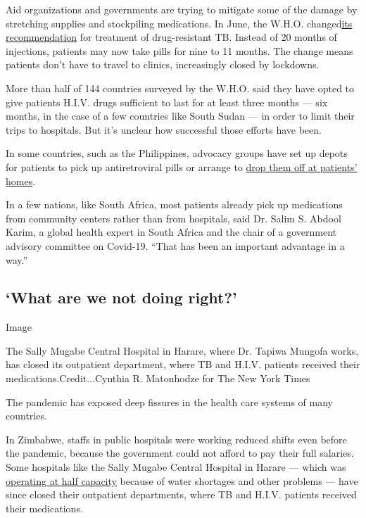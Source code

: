 Aid organizations and governments are trying to mitigate some of the
damage by stretching supplies and stockpiling medications. In June, the
W.H.O.
changed\href{https://www.who.int/news-room/detail/15-06-2020-who-urges-countries-to-enable-access-to-fully-oral-drug-resistant-tb-treatment-regimens}{its
recommendation} for treatment of drug-resistant TB. Instead of 20 months
of injections, patients may now take pills for nine to 11 months. The
change means patients don't have to travel to clinics, increasingly
closed by lockdowns.

More than half of 144 countries surveyed by the W.H.O. said they have
opted to give patients H.I.V. drugs sufficient to last for at least
three months --- six months, in the case of a few countries like South
Sudan --- in order to limit their trips to hospitals. But it's unclear
how successful those efforts have been.

In some countries, such as the Philippines, advocacy groups have set up
depots for patients to pick up antiretroviral pills or arrange to
\href{https://www.unaids.org/en/resources/presscentre/featurestories/2020/april/20200408_philippines}{drop
them off at patients' homes}.

In a few nations, like South Africa, most patients already pick up
medications from community centers rather than from hospitals, said Dr.
Salim S. Abdool Karim, a global health expert in South Africa and the
chair of a government advisory committee on Covid-19. ``That has been an
important advantage in a way.''

\hypertarget{what-are-we-not-doing-right}{%
\subsection{`What are we not doing
right?'}\label{what-are-we-not-doing-right}}

Image

The Sally Mugabe Central Hospital in Harare, where Dr. Tapiwa Mungofa
works, has closed its outpatient department, where TB and H.I.V.
patients received their medications.Credit...Cynthia R. Matonhodze for
The New York Times

The pandemic has exposed deep fissures in the health care systems of
many countries.

In Zimbabwe, staffs in public hospitals were working reduced shifts even
before the pandemic, because the government could not afford to pay
their full salaries. Some hospitals like the Sally Mugabe Central
Hospital in Harare --- which was
\href{https://www.newsday.co.zw/2020/02/sally-mugabe-hospital-operating-at-45-capacity/}{operating
at half capacity} because of water shortages and other problems --- have
since closed their outpatient departments, where TB and H.I.V. patients
received their medications.

